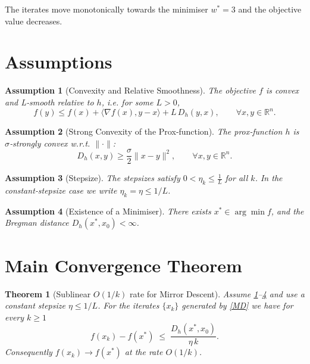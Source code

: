 \documentclass{article}
\newtheorem{theorem}{Theorem}
\newtheorem{assumption}{Assumption}
\newcommand{\inner}[2]{\langle #1,#2\rangle}
\newcommand{\D}[2]{D_{h}(#1,#2)}
\newcommand{\grad}{\nabla}
\begin{document}
The iterates move monotonically towards the minimiser $w^{*}=3$ and the objective value decreases.

\newpage
\section*{Assumptions}
\begin{assumption}[Convexity and Relative Smoothness]\label{ass:convex}
The objective $f$ is convex and \emph{L‑smooth relative to $h$}, i.e. for some $L>0$,
\[
f(y)\le f(x)+\inner{\grad f(x)}{y-x}+L\,\D{y}{x},\qquad\forall x,y\in\mathbb{R}^{n}. \tag{2}
\]
\end{assumption}
\begin{assumption}[Strong Convexity of the Prox‑function]\label{ass:strong}
The prox‑function $h$ is $\sigma$‑strongly convex w.r.t. $\|\cdot\|$:
\[
\D{x}{y}\ge\frac{\sigma}{2}\|x-y\|^{2},\qquad\forall x,y\in\mathbb{R}^{n}. \tag{3}
\]
\end{assumption}
\begin{assumption}[Stepsize]\label{ass:step}
The stepsizes satisfy $0<\eta_k\le {}$ for all $k$.  In the constant‑stepsize case we write $\eta_k=\eta{}/L$.
\end{assumption}
\begin{assumption}[Existence of a Minimiser]\label{ass:opt}
There exists $x^{*}\in\arg\min f$, and the Bregman distance $\D{x^{*}}{x_0}<\infty$.
\end{assumption}

\section*{Main Convergence Theorem}
\begin{theorem}[Sublinear $O(1/k)$ rate for Mirror Descent]\label{thm:rate}
Assume \ref{ass:convex}--\ref{ass:opt} and use a constant stepsize $\eta{}/L$.  
For the iterates $\{x_k\}$ generated by \eqref{MD} we have for every $k$
\[
f(x_k)-f(x^{*})\;\le\;\frac{\D{x^{*}}{x_0}}{\eta\,k}. \tag{4}
\]
Consequently $f(x_k)\to f(x^{*})$ at the rate $O(1/k)$.
\end{theorem}
\end{document}
